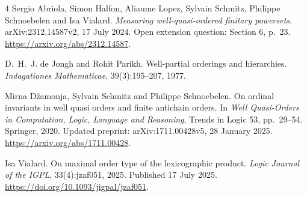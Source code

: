 \begin{thebibliography}{4}
Sergio Abriola, Simon Halfon, Aliaume Lopez, Sylvain Schmitz, Philippe
Schnoebelen and Isa Vialard.
\newblock \emph{Measuring well-quasi-ordered finitary powersets}.
\newblock arXiv:2312.14587v2, 17 July 2024.
\newblock Open extension question: Section 6, p.~23.
\newblock \url{https://arxiv.org/abs/2312.14587}.

D.~H.~J. de Jongh and Rohit Parikh.
\newblock Well-partial orderings and hierarchies.
\newblock \emph{Indagationes Mathematicae}, 39(3):195--207, 1977.

Mirna D{\v z}amonja, Sylvain Schmitz and Philippe Schnoebelen.
\newblock On ordinal invariants in well quasi orders and finite antichain orders.
\newblock In \emph{Well Quasi-Orders in Computation, Logic, Language and
Reasoning}, Trends in Logic 53, pp.~29--54. Springer, 2020.
\newblock Updated preprint: arXiv:1711.00428v5, 28 January 2025.
\newblock \url{https://arxiv.org/abs/1711.00428}.

Isa Vialard.
\newblock On maximal order type of the lexicographic product.
\newblock \emph{Logic Journal of the IGPL}, 33(4):jzaf051, 2025.
\newblock Published 17 July 2025.
\newblock \url{https://doi.org/10.1093/jigpal/jzaf051}.
\end{thebibliography}
